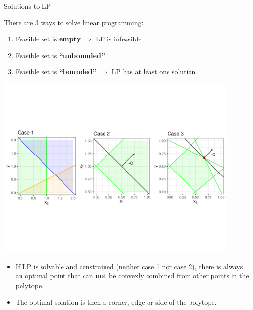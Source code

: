 \documentclass[11pt,compress,t,notes=noshow, xcolor=table]{beamer}
\begin{document}
\begin{vbframe}{Solutions to LP}

There are 3 ways to solve linear programming:

\begin{enumerate}
\item Feasible set is \textbf{empty} $\Rightarrow$ LP is infeasible
\item Feasible set is \textbf{\enquote{unbounded}}
\item Feasible set is \textbf{\enquote{bounded}} $\Rightarrow$ LP has at least one solution
\end{enumerate}

\vspace{\baselineskip}

\begin{center}
    \includegraphics[width=0.9\textwidth]{figure_man/cons-solutions-lp.png}
\end{center}


\framebreak

\begin{itemize}
\item If LP is solvable and constrained (neither case 1 nor case 2), there is always an optimal point that can  \textbf{not} be convexly combined from other points in the polytope.
\item The optimal solution is then a corner, edge or side of the polytope.
\end{itemize}


\end{vbframe}

\end{document}
